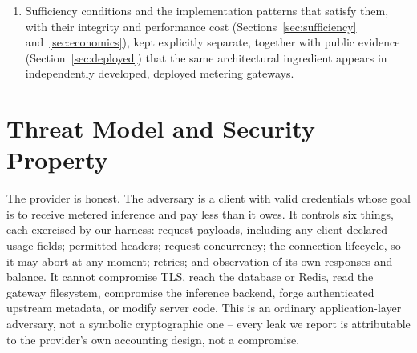 \documentclass[manuscript,review,anonymous]{acmart}
\begin{document}
\begin{enumerate}
three execution topologies, three accounting families including an asynchronous event
pipeline, two independent inference data planes, and a network-separated deployment, with
fail-closed integrity gates and independent recomputation.
\item Sufficiency conditions and the implementation patterns that satisfy them, with
their integrity and performance cost (Sections~\ref{sec:sufficiency}
and~\ref{sec:economics}), kept explicitly separate, together with
public evidence (Section~\ref{sec:deployed}) that the same architectural ingredient
appears in independently developed, deployed metering gateways.
\end{enumerate}

\begin{table}[t]
\caption{Adversary directions in LLM inference accounting. Prior work covers the first
three rows; this paper studies the fourth.}
\label{tab:quadrant}
\centering
{}
\end{table}

\section{Threat Model and Security Property}
\label{sec:threat}
The provider is honest. The adversary is a client with valid credentials whose goal is to
receive metered inference and pay less than it owes. It controls six things, each
exercised by our harness: request payloads, including any client-declared usage fields;
permitted headers; request concurrency; the connection lifecycle, so it may abort at any
moment; retries; and observation of its own responses and balance. It cannot compromise
TLS, reach the database or Redis, read the gateway filesystem, compromise the inference
backend, forge authenticated upstream metadata, or modify server code. This is an
ordinary application-layer adversary, not a symbolic cryptographic one -- every leak we
report is attributable to the provider's own accounting design, not a compromise.
\end{document}
